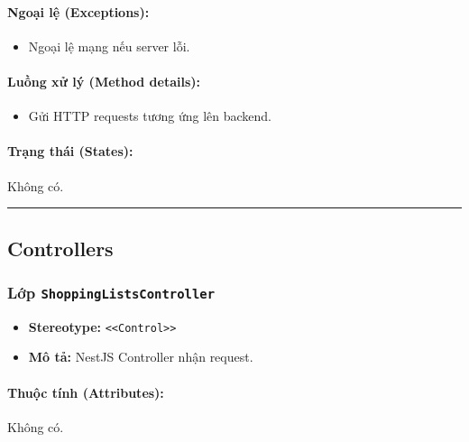 \documentclass[12pt,a4paper]{article}
\begin{document}
\paragraph{Ngoại lệ (Exceptions):}
\begin{itemize}[leftmargin=*]
    \item Ngoại lệ mạng nếu server lỗi.
\end{itemize}


\paragraph{Luồng xử lý (Method details):}
\begin{itemize}[leftmargin=*]
    \item Gửi HTTP requests tương ứng lên backend.
\end{itemize}


\paragraph{Trạng thái (States):}
Không có.

\vskip 0.5cm
\noindent\rule{\textwidth}{0.5pt}
\vskip 0.5cm

\subsection{Controllers}

\subsubsection{Lớp \texttt{ShoppingListsController}}
\begin{itemize}[leftmargin=*]
    \item \textbf{Stereotype:} \texttt{\textless{}\textless{}Control\textgreater{}\textgreater{}}
    \item \textbf{Mô tả:} NestJS Controller nhận request.
\end{itemize}

\paragraph{Thuộc tính (Attributes):}
Không có.
\end{document}
